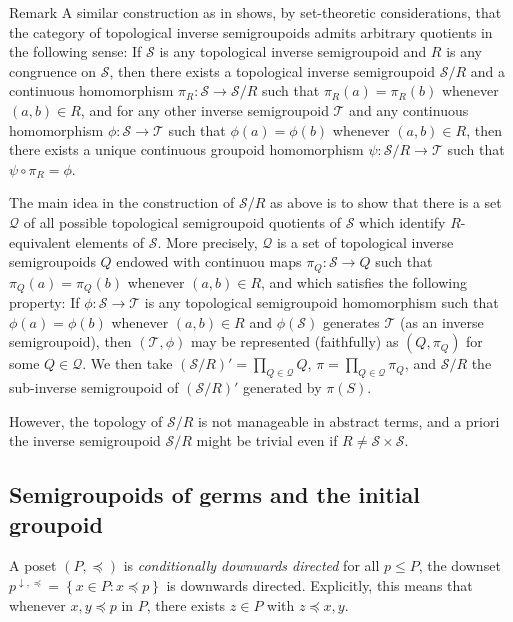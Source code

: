 \begin{denv*}{Remark}
A similar construction as in \cite{MR0412333} shows, by set-theoretic considerations, that the category of topological inverse semigroupoids admits arbitrary quotients in the following sense: If $\mathcal{S}$ is any topological inverse semigroupoid and $R$ is any congruence on $\mathcal{S}$, then there exists a topological inverse semigroupoid $\mathcal{S}/R$ and a continuous homomorphism $\pi_R\colon\mathcal{S}\to\mathcal{S}/R$ such that $\pi_R(a)=\pi_R(b)$ whenever $(a,b)\in R$, and for any other inverse semigroupoid $\mathcal{T}$ and any continuous homomorphism $\phi\colon\mathcal{S}\to\mathcal{T}$ such that $\phi(a)=\phi(b)$ whenever $(a,b)\in R$, then there exists a unique continuous groupoid homomorphism $\psi\colon\mathcal{S}/R\to\mathcal{T}$ such that $\psi\circ\pi_R=\phi$.

The main idea in the construction of $\mathcal{S}/R$ as above is to show that there is a set $\mathscr{Q}$ of all possible topological semigroupoid quotients of $\mathcal{S}$ which identify $R$-equivalent elements of $\mathcal{S}$. More precisely, $\mathscr{Q}$ is a set of topological inverse semigroupoids $Q$ endowed with continuou maps $\pi_Q\colon\mathcal{S}\to Q$ such that $\pi_Q(a)=\pi_Q(b)$ whenever $(a,b)\in R$, and which satisfies the following property: If $\phi\colon\mathcal{S}\to\mathcal{T}$ is any topological semigroupoid homomorphism such that $\phi(a)=\phi(b)$ whenever $(a,b)\in R$ and $\phi(\mathcal{S})$ generates $\mathcal{T}$ (as an inverse semigroupoid), then $(\mathcal{T},\phi)$ may be represented (faithfully) as $(Q,\pi_Q)$ for some $Q\in\mathscr{Q}$. We then take $(\mathcal{S}/R)'=\prod_{Q\in\mathscr{Q}}Q$, $\pi=\prod_{Q\in\mathscr{Q}}\pi_Q$, and $\mathcal{S}/R$ the sub-inverse semigroupoid of $(\mathcal{S}/R)'$ generated by $\pi(S)$.

However, the topology of $\mathcal{S}/R$ is not manageable in abstract terms, and a priori the inverse semigroupoid $\mathcal{S}/R$ might be trivial even if $R\neq\mathcal{S}\times\mathcal{S}$.
\end{denv*}

\subsection{Semigroupoids of germs and the initial groupoid}\label{subsec:groupoidofgerms}

\begin{definition}
A poset $(P,\preceq)$ is \emph{conditionally downwards directed} for all $p\leq P$, the downset $p^{\downarrow,\preceq}=\left\{x\in P:x\preceq p\right\}$ is downwards directed. Explicitly, this means that whenever $x,y\preceq p$ in $P$, there exists $z\in P$ with $z\preceq x,y$.
\end{definition}


